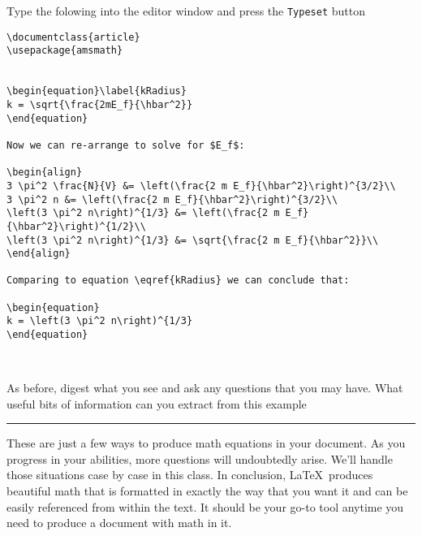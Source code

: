 \begin{enumerate}
\probtwo  Type the folowing into the editor window and press the
\verb!Typeset! button 
\begin{Verbatim}
\documentclass{article}
\usepackage{amsmath}


\begin{equation}\label{kRadius}
k = \sqrt{\frac{2mE_f}{\hbar^2}}
\end{equation}

Now we can re-arrange to solve for $E_f$:

\begin{align}
3 \pi^2 \frac{N}{V} &= \left(\frac{2 m E_f}{\hbar^2}\right)^{3/2}\\
3 \pi^2 n &= \left(\frac{2 m E_f}{\hbar^2}\right)^{3/2}\\
\left(3 \pi^2 n\right)^{1/3} &= \left(\frac{2 m E_f}{\hbar^2}\right)^{1/2}\\
\left(3 \pi^2 n\right)^{1/3} &= \sqrt{\frac{2 m E_f}{\hbar^2}}\\
\end{align}

Comparing to equation \eqref{kRadius} we can conclude that:

\begin{equation}
k = \left(3 \pi^2 n\right)^{1/3}
\end{equation}



\end{Verbatim}
As before, digest what you see and ask any questions that you may
have.  What useful bits of information can you extract from this example
\end{enumerate}

\noindent\rule{5 in}{0.01 in}

These are just a few ways to produce math equations in your document.
As you progress in your abilities, more questions will undoubtedly
arise.  We'll handle those situations case by case in this class.
In conclusion, \LaTeX ~produces beautiful math that is formatted in
exactly the way that you want it and can be easily referenced from
within the text.  It should be your go-to tool anytime you need to
produce a document with math in it.

